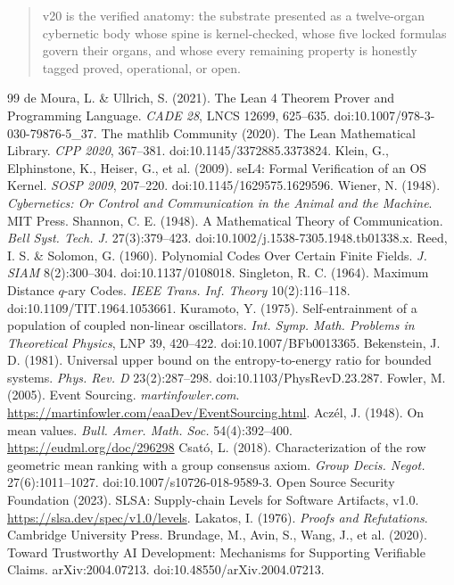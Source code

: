 \documentclass[11pt]{article}
\theoremstyle{plain}
\theoremstyle{definition}
\theoremstyle{remark}
\begin{document}
\begin{quote}
v20 is the verified anatomy: the substrate presented as a twelve-organ cybernetic body
whose spine is kernel-checked, whose five locked formulas govern their organs, and whose
every remaining property is honestly tagged proved, operational, or open.
\end{quote}

\begin{thebibliography}{99}
 de Moura, L. \& Ullrich, S. (2021). The Lean 4 Theorem Prover and Programming Language. \emph{CADE 28}, LNCS 12699, 625--635. doi:10.1007/978-3-030-79876-5\_37.
 The mathlib Community (2020). The Lean Mathematical Library. \emph{CPP 2020}, 367--381. doi:10.1145/3372885.3373824.
 Klein, G., Elphinstone, K., Heiser, G., et al. (2009). seL4: Formal Verification of an OS Kernel. \emph{SOSP 2009}, 207--220. doi:10.1145/1629575.1629596.
 Wiener, N. (1948). \emph{Cybernetics: Or Control and Communication in the Animal and the Machine}. MIT Press.
 Shannon, C. E. (1948). A Mathematical Theory of Communication. \emph{Bell Syst. Tech. J.} 27(3):379--423. doi:10.1002/j.1538-7305.1948.tb01338.x.
 Reed, I. S. \& Solomon, G. (1960). Polynomial Codes Over Certain Finite Fields. \emph{J. SIAM} 8(2):300--304. doi:10.1137/0108018.
 Singleton, R. C. (1964). Maximum Distance $q$-ary Codes. \emph{IEEE Trans. Inf. Theory} 10(2):116--118. doi:10.1109/TIT.1964.1053661.
 Kuramoto, Y. (1975). Self-entrainment of a population of coupled non-linear oscillators. \emph{Int. Symp. Math. Problems in Theoretical Physics}, LNP 39, 420--422. doi:10.1007/BFb0013365.
 Bekenstein, J. D. (1981). Universal upper bound on the entropy-to-energy ratio for bounded systems. \emph{Phys. Rev. D} 23(2):287--298. doi:10.1103/PhysRevD.23.287.
 Fowler, M. (2005). Event Sourcing. \emph{martinfowler.com}. \url{https://martinfowler.com/eaaDev/EventSourcing.html}.
 Acz\'el, J. (1948). On mean values. \emph{Bull. Amer. Math. Soc.} 54(4):392--400. \url{https://eudml.org/doc/296298}
 Csat\'o, L. (2018). Characterization of the row geometric mean ranking with a group consensus axiom. \emph{Group Decis. Negot.} 27(6):1011--1027. doi:10.1007/s10726-018-9589-3.
 Open Source Security Foundation (2023). SLSA: Supply-chain Levels for Software Artifacts, v1.0. \url{https://slsa.dev/spec/v1.0/levels}.
 Lakatos, I. (1976). \emph{Proofs and Refutations}. Cambridge University Press.
 Brundage, M., Avin, S., Wang, J., et al. (2020). Toward Trustworthy AI Development: Mechanisms for Supporting Verifiable Claims. arXiv:2004.07213. doi:10.48550/arXiv.2004.07213.
\end{thebibliography}
\end{document}

